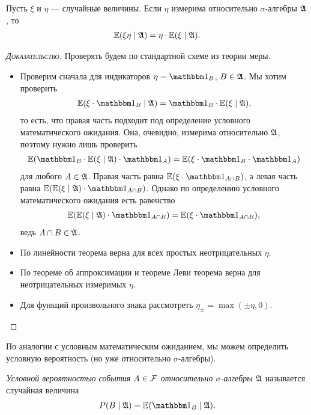 \documentclass[../main.tex]{subfiles}
\begin{document}
 \begin{thm}
  Пусть $ \xi $ и $ \eta $ --- случайные величины. Если $ \eta $ измерима относительно $ \sigma $-алгебры $ \mathfrak A $, то
  \begin{align*}
   \mathbb E(\xi\eta \mid\mathfrak A) = \eta \cdot \mathbb E(\xi \mid \mathfrak A).
  \end{align*}
 \end{thm}
 \begin{proof}[\normalfont\textsc{Доказательство}]
  Проверять будем по стандартной схеме из теории меры.
  \begin{itemize}
   \item Проверим сначала для индикаторов $ \eta = \Ind_B $, $ B \in \mathfrak A $. Мы хотим проверить
    \begin{align*}
     \E(\xi\cdot\Ind_B \mid \A) = \Ind_B \cdot \E(\xi \mid \A),
    \end{align*} то есть, что правая часть подходит под определение условного математического ожидания. Она, очевидно, измерима относительно $ \mathfrak A $, поэтому нужно лишь проверить
    \begin{align*}
     \E(\Ind_B \cdot \E(\xi\mid\A) \cdot \Ind_A) = \E(\xi\cdot\Ind_B\cdot\Ind_A)
    \end{align*} для любого $ A\in\mathfrak A $. Правая часть равна $ \E(\xi\cdot\Ind_{A \cap B}) $, а левая часть равна $ \E(\E(\xi \mid \A)\cdot\Ind_{A\cap B}) $. Однако по определению условного математического ожидания есть равенство
    \begin{align*}
     \E(\E(\xi \mid \A)\cdot\Ind_{A\cap B}) = \E(\xi\cdot\Ind_{A\cap B}),
    \end{align*} ведь $ A \cap B \in \mathfrak A $.
   \item По линейности теорема верна для всех простых неотрицательных $ \eta $.
   \item По теореме об аппроксимации и теореме Леви теорема верна для неотрицательных измеримых $ \eta $.
   \item Для функций произвольного знака рассмотреть $ \eta_\pm  =\max(\pm \eta, 0) $.
  \end{itemize}
 \end{proof}

 По аналогии с условным математическим ожиданием, мы можем определить условную вероятность (но уже относительно $ \sigma $-алгебры).

 \begin{df}
  \textit{Условной вероятностью события $ A \in \mathcal F $ относительно $ \sigma $-алгебры $ \mathfrak A $} называется случайная величина
  \begin{align*}
   P(B \mid \A) = \E(\Ind_B \mid \A).
  \end{align*}
 \end{df}
\end{document}
